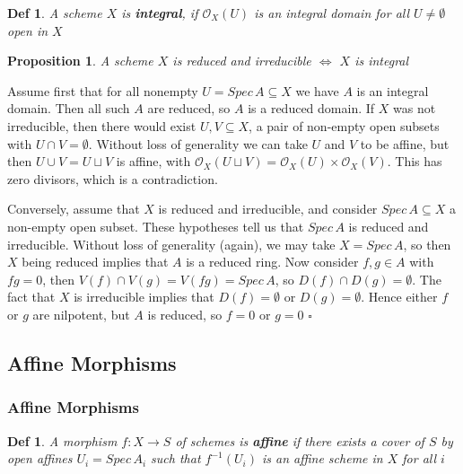 \documentclass{article}
\newtheorem{definition}[theorem]{Def}
\newtheorem{proposition}[theorem]{Proposition}
\newenvironment{Proof}{{\noindent \indent \it Proof:\quad}}{\hfill $\square$\par}
\begin{document}
\begin{definition}
    A scheme $X$ is \textbf{integral}, if $\mathcal O_X(U)$ is an integral domain for all $U \ne \emptyset$ open in $X$
\end{definition}

\begin{proposition}
    A scheme $X$ is reduced and irreducible $\Leftrightarrow$ $X$ is integral
\end{proposition}
\begin{Proof}
    Assume first that for all nonempty $U = Spec\, A \subseteq X$ we have $A$ is an integral domain. Then all such $A$ are reduced, so $A$ is a reduced domain. If $X$ was not irreducible, then there would exist $U, V \subseteq X$, a pair of non-empty open subsets with $U \cap V = \emptyset$. Without loss of generality we can take $U$ and $V$ to be affine, but then $U \cup V = U \sqcup V$ is affine, with $\mathcal O_X(U \sqcup V) = \mathcal O_X(U)\times \mathcal O_X(V)$. This has zero divisors, which is a contradiction.
    
Conversely, assume that $X$ is reduced and irreducible, and consider
$Spec\, A \subseteq X$ a non-empty open subset. These hypotheses tell us that $Spec\, A$ is reduced and irreducible.
Without loss of generality (again), we may take $X = Spec\, A$, so then $X$ being reduced implies that
$A$ is a reduced ring. Now consider $f, g \in A$ with $fg = 0$, then $V (f) \cap V (g) = V (fg) = Spec\, A$, so
$D(f) \cap D(g) = \emptyset$. The fact that $X$ is irreducible implies that $D(f) = \emptyset$ or $D(g) = \emptyset$. Hence either $f$ or $g$ are nilpotent, but $A$ is reduced, so $f = 0$ or $g = 0$
\end{Proof}





\newpage
\subsection{Affine Morphisms}

\subsubsection{Affine Morphisms}

\begin{definition}
    A morphism $f : X \to S$ of schemes is \textbf{affine} if there exists a cover of $S$ by open affines $U_i=Spec\,A_i$ such that $f^{-1}(U_i)$ is an affine scheme in $X$ for all $i$
\end{definition}
\end{document}
